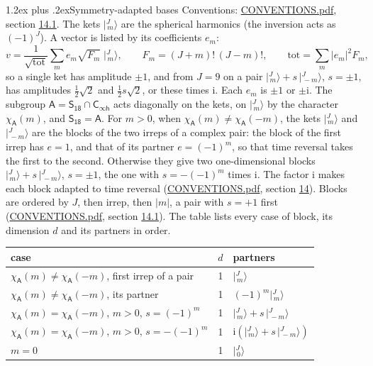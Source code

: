 \documentclass[10pt,a4paper]{article}
\makeatletter
\renewcommand\section{\@startsection{section}{1}{\z@}{-3ex plus -1ex minus -.2ex}%
  {1.2ex plus .2ex}{\normalfont\large\sffamily\bfseries\color{parttitle}}}
\numberwithin{equation}{section}
\newcommand{\grp}[1]{\mathsf{#1}}
\newcommand{\iunit}{\mathrm{i}}
\newcommand{\chiA}{\chi_{\grp{A}}}
\newcommand{\jm}[2]{\bigl\lvert{}^{#1}_{\,#2}\bigr\rangle}
\makeatother
\begin{document}
\section{Symmetry-adapted bases}\label{s:bases}
Conventions: \href{../../CONVENTIONS.pdf}{CONVENTIONS.pdf}, section \href{../../CONVENTIONS.pdf\#conv.14.1}{14.1}.
\leavevmode\label{n:index.m}\label{n:vector.ket}The kets $\jm{J}{m}$ are the spherical harmonics (the inversion acts as $(-1)^J$). \label{n:index.ketcoefficient}\label{n:vector.basis.symmetry}\label{n:index.ketweight}\label{n:index.total}A vector is listed by its coefficients $e_m$:
\begin{equation}\label{e:ket}v = \frac{1}{\sqrt{\mathrm{tot}}}\sum_m e_m\sqrt{F_m}\;\jm{J}{m},\qquad F_m = (J+m)!\,(J-m)!,\qquad \mathrm{tot} = \sum_m |e_m|^2F_m,\end{equation}
\leavevmode\label{n:index.pair.sign}so a single ket has amplitude $\pm1$, and from $J = 9$ on a pair $\jm{J}{m} + s\,\jm{J}{-m}$, $s = \pm1$, has amplitudes $\tfrac{1}{2}\sqrt{2}$ and $\tfrac{1}{2}s\sqrt{2}$, or these times $\iunit$. Each $e_m$ is $\pm1$ or $\pm\iunit$.
\leavevmode\label{n:group.A}\label{n:function.character.abelian}The subgroup $\grp{A} = \grp{S_{18}}\cap\grp{C_{\infty h}}$ acts diagonally on the kets, on $\jm{J}{m}$ by the character $\chiA(m)$, and $\grp{S_{18}} = \grp{A}$. For $m > 0$, when $\chiA(m) \ne \chiA(-m)$, the kets $\jm{J}{m}$ and $\jm{J}{-m}$ are the blocks of the two irreps of a complex pair: the block of the first irrep has $e = 1$, and that of its partner $e = (-1)^m$, so that time reversal takes the first to the second. Otherwise they give two one-dimensional blocks $\jm{J}{m} + s\,\jm{J}{-m}$, $s = \pm1$, the one with $s = -(-1)^m$ times $\iunit$. The factor $\iunit$ makes each block adapted to time reversal (\href{../../CONVENTIONS.pdf}{CONVENTIONS.pdf}, section \href{../../CONVENTIONS.pdf\#conv.14}{14}). Blocks are ordered by $J$, then irrep, then $|m|$, a pair with $s = +1$ first (\href{../../CONVENTIONS.pdf}{CONVENTIONS.pdf}, section \href{../../CONVENTIONS.pdf\#conv.14.1}{14.1}).
\leavevmode\label{n:head.case}\label{n:head.partners}The table lists every case of block, its dimension $d$ and its partners in order.
\begin{center}\begin{tabular}{@{}lrl@{}}\toprule
case & $d$ & partners\\\midrule
$\chiA(m) \ne \chiA(-m)$, first irrep of a pair & 1 & $\jm{J}{m}$\\
$\chiA(m) \ne \chiA(-m)$, its partner & 1 & $(-1)^m\jm{J}{m}$\\
$\chiA(m) = \chiA(-m)$, $m > 0$, $s = (-1)^m$ & 1 & $\jm{J}{m} + s\,\jm{J}{-m}$\\
$\chiA(m) = \chiA(-m)$, $m > 0$, $s = -(-1)^m$ & 1 & $\iunit(\jm{J}{m} + s\,\jm{J}{-m})$\\
$m = 0$ & 1 & $\jm{J}{0}$\\
\bottomrule\end{tabular}\end{center}
\end{document}
